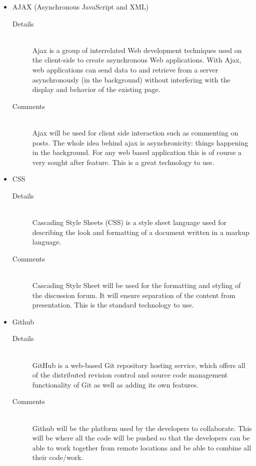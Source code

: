 \documentclass[10pt]{article}
\begin{document}
\begin{description}
\begin{itemize}
\begin{description}
					\end{description}
				\item AJAX (Asynchronous JavaScript and XML)
					\begin{description}
						\item[Details] \hfill \\
							Ajax is a group of interrelated Web development techniques used on the client-side to create asynchronous Web applications.
							 With Ajax, web applications can send data to and retrieve from a server asynchronously (in the background) without interfering
							 with the display and behavior of the existing page.
						\item[Comments]\hfill \\
                                                        Ajax will be used for client side interaction such as commenting on posts. The whole idea behind ajax is asynchronicity: things happening in the background.
					For any web based application this is of course a very sought after feature. This is a great technology to use.
					\end{description}
				\item CSS
					\begin{description}
						\item[Details] \hfill \\
							Cascading Style Sheets (CSS) is a style sheet language used for describing the look and formatting of a document written in a markup language.
						\item[Comments]\hfill \\
Cascading Style Sheet will be used for the formatting and styling of the discussion forum. It will ensure separation of the content from presentation. This is the standard technology to use.
					\end{description}	
				\item Github
					\begin{description}
						\item[Details] \hfill \\
                                                        GitHub is a web-based Git repository hosting service, which offers all of the distributed revision control and source code management functionality of Git as well as adding its own features.
                                                \item[Comments]\hfill \\
                                                        Github will be the platform used by the developers to collaborate. This will be where all the code will be pushed so that the developers can be able to work together from remote locations and be able to combine all their code/work.

\end{description}
\end{itemize}
\end{description}
\end{document}
